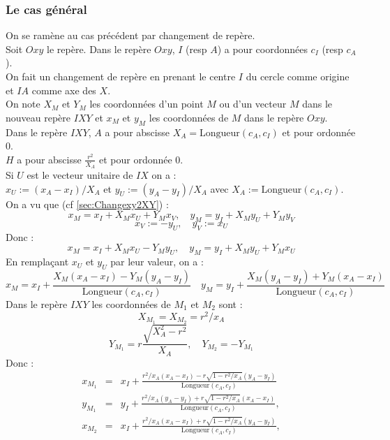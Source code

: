 \documentclass[12pt,a4paper]{book}
\begin{document}
\begin{giacjshere}
\subsubsection{Le cas g\'en\'eral}
On se ram\`ene au cas pr\'ec\'edent par changement de rep\`ere.\\
Soit $Oxy$ le rep\`ere.
Dans le rep\`ere $Oxy$, $I$ (resp $A$) a pour coordonn\'ees $c_I$ (resp $c_A$).\\
On fait un changement de rep\`ere en prenant le centre $I$ du cercle
 comme origine et $ IA$ comme axe des $ X$.\\
On note $ X_M$ et $ Y_M$ les coordonn\'ees d'un point $ M$ ou d'un 
vecteur $ M$ dans le nouveau rep\`ere $IXY$ et 
$ x_M$ et $ y_M$ les coordonn\'ees de $M$ dans le rep\`ere $Oxy$.\\
Dans le rep\`ere $IXY$, $A$ a pour abscisse $X_A=\mbox{Longueur}(c_A,c_I)$  et 
pour ordonn\'ee 0.\\
$H$ a pour abscisse $\frac{r^2}{X_A}$ et pour ordonn\'ee 0.\\
Si $ U$ est le vecteur unitaire de $ IX$ on a :\\
$ x_U:=(x_A-x_I)/X_A$ et $ y_U:=(y_A-y_I)/X_A$ avec $ X_A:=\mbox{Longueur}(c_A,c_I)$.\\
On a vu que (cf \ref{sec:Changexy2XY}) :
$$ x_M=x_I+X_Mx_U+Y_Mx_V, \quad  y_M=y_I+X_My_U+Y_My_V $$
$$ x_V:=-y_U, \quad y_V:= x_U$$
Donc :\\
$$ x_M=x_I+X_Mx_U-Y_My_U, \quad y_M=y_I+X_My_U+Y_Mx_U$$
En rempla\c{c}ant $ x_U$ et $ y_U$ par leur valeur, on a :\\
$$ x_M=x_I+\frac{X_M(x_A-x_I)-Y_M(y_A-y_I)}{\mbox{Longueur}(c_A,c_I)}
\quad
y_M=y_I+\frac{X_M(y_A-y_I)+Y_M(x_A-x_I)}{\mbox{Longueur}(c_A,c_I)}$$
Dans le rep\`ere $IXY$ les coordonn\'ees de $ M_1$ et $ M_2$ sont :\\
$$ X_{M_1}=X_{M_2}=r^2/x_A$$
$$ Y_{M_1}=r\frac{\sqrt{X_A^2-r^2}}{X_A}, \quad Y_{M_2}=-Y_{M_1} $$
Donc :
\begin{eqnarray*}
 x_{M_1}&=&x_I+\frac{r^2/x_A(x_A-x_I)-r\sqrt{1-r^2/x_A}(y_A-y_I)}{\mbox{Longueur}(c_A,c_I)} \\
y_{M_1}&=&y_I+\frac{r^2/x_A(y_A-y_I)+r\sqrt{1-r^2/x_A}(x_A-x_I)}{\mbox{Longueur}(c_A,c_I)}, \\
x_{M_2}&=&x_I+\frac{r^2/x_A(x_A-x_I)+r\sqrt{1-r^2/x_A}(y_A-y_I)}{\mbox{Longueur}(c_A,c_I)},\\

\end{eqnarray*}
\end{giacjshere}
\end{document}
